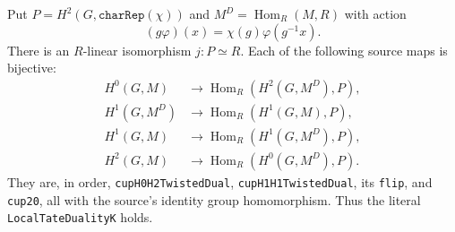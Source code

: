 \begin{proposition}
\label{prop:lk-tate}
Put $P=H^2(G,\texttt{charRep}(\chi))$ and
$M^D=\operatorname{Hom}_R(M,R)$ with action
\[
 (g\varphi)(x)=\chi(g)\varphi(g^{-1}x).
 \tag{LK.6}
\]
There is an $R$-linear isomorphism $j:P\simeq R$.  Each of the
following source maps is bijective:
\[
\begin{aligned}
 H^0(G,M)&\longrightarrow\operatorname{Hom}_R(H^2(G,M^D),P),\\
 H^1(G,M^D)&\longrightarrow\operatorname{Hom}_R(H^1(G,M),P),\\
 H^1(G,M)&\longrightarrow\operatorname{Hom}_R(H^1(G,M^D),P),\\
 H^2(G,M)&\longrightarrow\operatorname{Hom}_R(H^0(G,M^D),P).
\end{aligned}
\tag{LK.7}
\]
They are, in order, \texttt{cupH0H2TwistedDual},
\texttt{cupH1H1TwistedDual}, its \texttt{flip}, and
\texttt{cup20}, all with the source's identity group homomorphism.
Thus the literal \texttt{LocalTateDualityK} holds.
\end{proposition}

